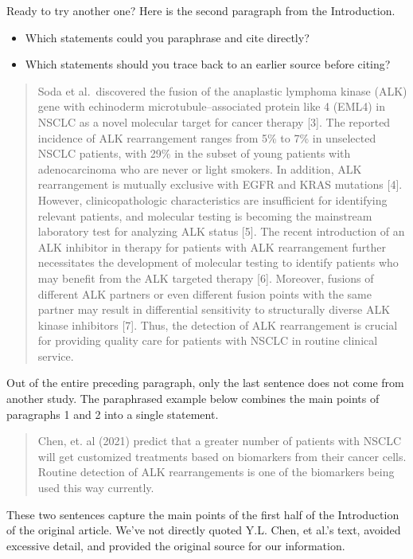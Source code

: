 \documentclass[
]{book}
\providecommand{\tightlist}{%
  \setlength{\itemsep}{0pt}\setlength{\parskip}{0pt}}
\begin{document}
Ready to try another one? Here is the second paragraph from the Introduction.

\begin{itemize}
\tightlist
\item
  Which statements could you paraphrase and cite directly?
\item
  Which statements should you trace back to an earlier source before citing?
\end{itemize}

\begin{quote}
Soda et al.~discovered the fusion of the anaplastic lymphoma kinase (ALK) gene with echinoderm microtubule--associated protein like 4 (EML4) in NSCLC as a novel molecular target for cancer therapy {[}3{]}. The reported incidence of ALK rearrangement ranges from 5\% to 7\% in unselected NSCLC patients, with 29\% in the subset of young patients with adenocarcinoma who are never or light smokers. In addition, ALK rearrangement is mutually exclusive with EGFR and KRAS mutations {[}4{]}. However, clinicopathologic characteristics are insufficient for identifying relevant patients, and molecular testing is becoming the mainstream laboratory test for analyzing ALK status {[}5{]}. The recent introduction of an ALK inhibitor in therapy for patients with ALK rearrangement further necessitates the development of molecular testing to identify patients who may benefit from the ALK targeted therapy {[}6{]}. Moreover, fusions of different ALK partners or even different fusion points with the same partner may result in differential sensitivity to structurally diverse ALK kinase inhibitors {[}7{]}. Thus, the detection of ALK rearrangement is crucial for providing quality care for patients with NSCLC in routine clinical service.
\end{quote}

Out of the entire preceding paragraph, only the last sentence does not come from another study. The paraphrased example below combines the main points of paragraphs 1 and 2 into a single statement.

\begin{quote}
Chen, et. al (2021) predict that a greater number of patients with NSCLC will get customized treatments based on biomarkers from their cancer cells. Routine detection of ALK rearrangements is one of the biomarkers being used this way currently.
\end{quote}

These two sentences capture the main points of the first half of the Introduction of the original article. We've not directly quoted Y.L. Chen, et al.'s text, avoided excessive detail, and provided the original source for our information.
\end{document}
